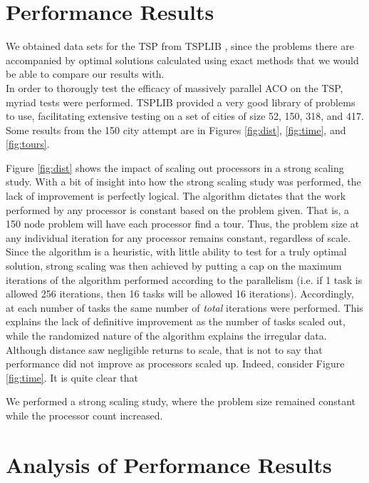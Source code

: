 \documentclass[twocolumn]{article}
\begin{document}
\section{Performance Results}

We obtained data sets for the TSP from TSPLIB \cite{tsplib}, since the problems
there are accompanied by optimal solutions calculated using exact methods that
we would be able to compare our results with. \\

In order to thorougly test the efficacy of massively parallel ACO on the TSP,
myriad tests were performed. TSPLIB provided a very good library of problems
to use, facilitating extensive testing on a set of cities of size 52, 150,
318, and 417. Some results from the 150 city attempt are in Figures \ref{fig:dist},
\ref {fig:time}, and \ref{fig:tours}. 

Figure \ref{fig:dist} shows the impact of scaling out processors in a strong
scaling study. With a bit of insight into how the strong scaling study was
performed, the lack of improvement is perfectly logical. The algorithm dictates
that the work performed by any processor is constant based on the problem given.
That is, a 150 node problem will have each processor find a tour. Thus, the problem
size at any individual iteration for any processor remains constant, regardless of
scale. Since the algorithm is a heuristic, with little ability to test for a truly
optimal solution, strong scaling was then achieved by putting a cap on the maximum
iterations of the algorithm performed according to the parallelism (i.e. if 1 task
is allowed 256 iterations, then 16 tasks will be allowed 16 iterations). Accordingly,
at each number of tasks the same number of \emph{total} iterations were performed. 
This explains the lack of definitive improvement as the number of tasks scaled out,
while the randomized nature of the algorithm explains the irregular data. \\

Although distance saw negligible returns to scale, that is not to say that 
performance did not improve as processors scaled up. Indeed, consider Figure
\ref{fig:time}. It is quite clear that 

We performed a strong scaling study, where the problem size remained constant
while the processor count increased.\\


\section{Analysis of Performance Results}
\end{document}
